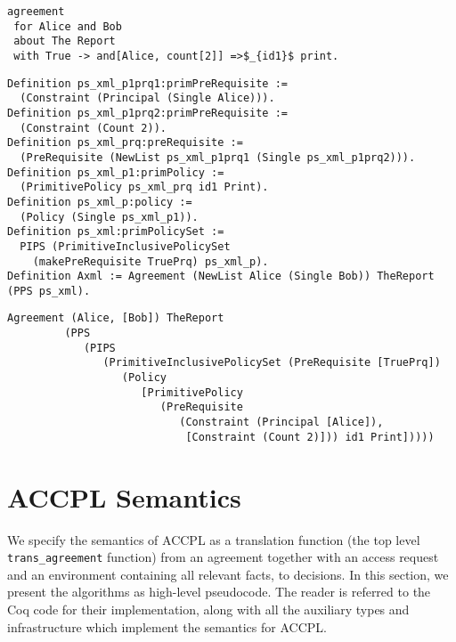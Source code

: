 \documentclass[runningheads,a4paper]{llncs}
\newcommand{\syn}{\texttt}
\begin{document}
\lstset{language=Pucella2006, captionpos=b}
\begin{lstlisting}[frame=single, caption={Example Agreement for Alice and Bob}, label={lst:agreementinAST}, mathescape]
agreement
 for Alice and Bob
 about The Report
 with True -> and[Alice, count[2]] =>$_{id1}$ print.
\end{lstlisting}

\begin{lstlisting}
Definition ps_xml_p1prq1:primPreRequisite := 
  (Constraint (Principal (Single Alice))).
Definition ps_xml_p1prq2:primPreRequisite := 
  (Constraint (Count 2)).
Definition ps_xml_prq:preRequisite := 
  (PreRequisite (NewList ps_xml_p1prq1 (Single ps_xml_p1prq2))).
Definition ps_xml_p1:primPolicy := 
  (PrimitivePolicy ps_xml_prq id1 Print).
Definition ps_xml_p:policy := 
  (Policy (Single ps_xml_p1)).
Definition ps_xml:primPolicySet :=
  PIPS (PrimitiveInclusivePolicySet
    (makePreRequisite TruePrq) ps_xml_p).
Definition Axml := Agreement (NewList Alice (Single Bob)) TheReport (PPS ps_xml).
\end{lstlisting}

\begin{lstlisting}
Agreement (Alice, [Bob]) TheReport
         (PPS
            (PIPS
               (PrimitiveInclusivePolicySet (PreRequisite [TruePrq])
                  (Policy
                     [PrimitivePolicy
                        (PreRequisite
                           (Constraint (Principal [Alice]),
                            [Constraint (Count 2)])) id1 Print]))))

\end{lstlisting}

\section{ACCPL Semantics}
We specify the semantics of \ac{ACCPL} as a translation function (the top level \syn{trans_agreement} function) from
an agreement together with an access request and an environment
containing all relevant facts, to decisions.  In this section, we
present the algorithms as high-level pseudocode.  The reader is
referred to the Coq code for their implementation, along with all the
auxiliary types and infrastructure which implement the semantics for
\ac{ACCPL}.
\end{document}
